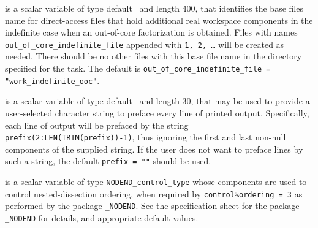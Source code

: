 \documentclass{galahad}
\begin{document}
\begin{description}
is a scalar variable of type default \character\
and length 400, that identifies the base files name for direct-access files that
hold additional real workspace components in the indefinite case when an
out-of-core factorization is obtained.
Files with names
{\tt out\_of\_core\_indefinite\_file}
appended with {\tt 1, 2, \ldots} will be created as needed.
There should be no other files with this base file name in the directory
specified for the task.
The default is
{\tt out\_of\_core\_indefinite\_file = "work\_indefinite\_ooc"}.

 is a scalar variable of type default \character\
and length 30, that may be used to provide a user-selected
character string to preface every line of printed output.
Specifically, each line of output will be prefaced by the string
{\tt prefix(2:LEN(TRIM(prefix))-1)},
thus ignoring the first and last non-null components of the
supplied string. If the user does not want to preface lines by such
a string, the default {\tt prefix = ""} should be used.

 is a scalar variable of type
{\tt NODEND\_control\_type}
whose components are used to control nested-dissection ordering, when 
required by {\tt control\%ordering = 3} as performed by the package
{\tt \libraryname\_NODEND}.
See the specification sheet for the package
{\tt \libraryname\_NODEND}
for details, and appropriate default values.

\end{description}

\end{document}
